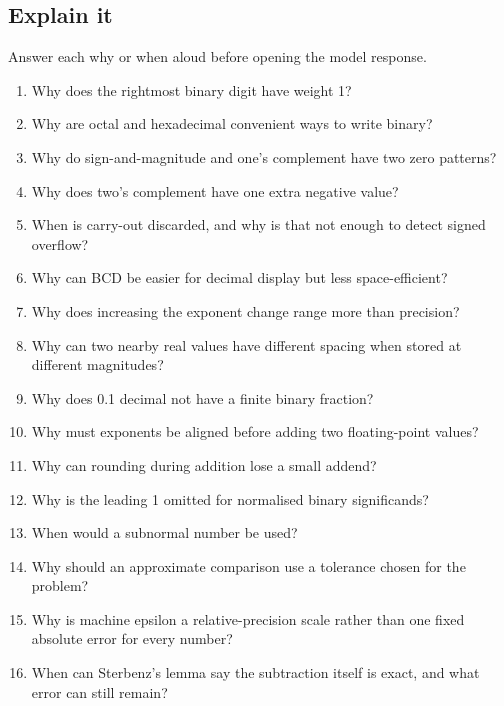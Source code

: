 \documentclass[11pt]{article}
\begin{document}
\begin{keepsection}
\section{Explain it}

Answer each why or when aloud before opening the model response.

\begin{enumerate}
\item Why does the rightmost binary digit have weight 1?
\item Why are octal and hexadecimal convenient ways to write binary?
\item Why do sign-and-magnitude and one’s complement have two zero patterns?
\item Why does two’s complement have one extra negative value?
\item When is carry-out discarded, and why is that not enough to detect signed overflow?
\item Why can BCD be easier for decimal display but less space-efficient?
\item Why does increasing the exponent change range more than precision?
\item Why can two nearby real values have different spacing when stored at different magnitudes?
\item Why does 0.1 decimal not have a finite binary fraction?
\item Why must exponents be aligned before adding two floating-point values?
\item Why can rounding during addition lose a small addend?
\item Why is the leading 1 omitted for normalised binary significands?
\item When would a subnormal number be used?
\item Why should an approximate comparison use a tolerance chosen for the problem?
\item Why is machine epsilon a relative-precision scale rather than one fixed absolute error for every number?
\item When can Sterbenz’s lemma say the subtraction itself is exact, and what error can still remain?
\end{enumerate}

\end{keepsection}
\end{document}

